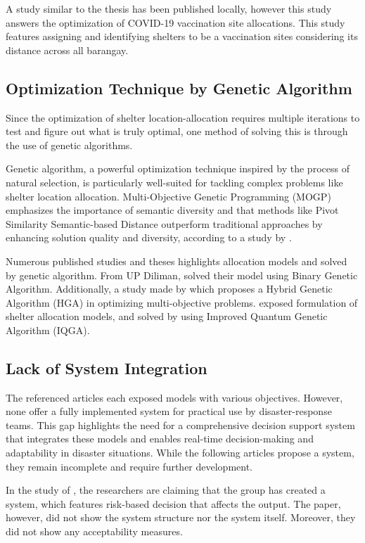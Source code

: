 	A study similar to the thesis has been published locally, however this study answers the optimization of COVID-19 vaccination site allocations\parencite{Kurt2021}. This study features assigning and identifying shelters to be a vaccination sites considering its distance across all barangay.

\subsection{Optimization Technique by Genetic Algorithm}
	Since the optimization of shelter location-allocation  requires multiple iterations to test and figure out what is truly optimal, one method of solving this is through the use of genetic algorithms.
	
	Genetic algorithm, a powerful optimization technique inspired by the process of natural selection, is particularly well-suited for tackling complex problems like shelter location allocation. Multi-Objective Genetic Programming (MOGP) emphasizes the importance of semantic diversity and that methods like Pivot Similarity Semantic-based Distance outperform traditional approaches by enhancing solution quality and diversity, according to a study by \textcite{Edgar2020}.
	
	Numerous published studies and theses highlights allocation models and solved by genetic algorithm. From UP Diliman, \textcite{LeahUP} solved their model using Binary Genetic Algorithm. Additionally, a study made by \textcite{Ahmed2020}  which proposes a Hybrid Genetic Algorithm (HGA) in optimizing multi-objective problems. \textcite{Yin2023} exposed formulation of shelter allocation models, and solved by using Improved Quantum Genetic Algorithm (IQGA). 
	

\subsection{Lack of System Integration}
	The referenced articles each exposed models with various objectives. However, none offer a fully implemented system for practical use by disaster-response teams. This gap highlights the need for a comprehensive decision support system that integrates these models and enables real-time decision-making and adaptability in disaster situations. While the following articles propose a system, they remain incomplete and require further development.
	
	In the study of \textcite{Amir2023}, the researchers are claiming that the group has created a system, which features risk-based decision that affects the output. The paper, however, did not show the system structure nor the system itself. Moreover, they did not show any acceptability measures. \parencite{Amir2023}
	
